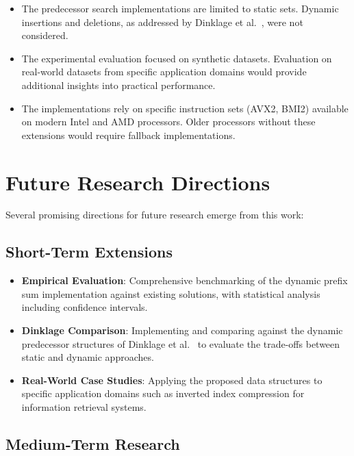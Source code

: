 \begin{itemize}
    \item The predecessor search implementations are limited to static sets. Dynamic insertions and deletions, as addressed by Dinklage et al.~\cite{Patrick_2021}, were not considered.

    \item The experimental evaluation focused on synthetic datasets. Evaluation on real-world datasets from specific application domains would provide additional insights into practical performance.

    \item The implementations rely on specific instruction sets (AVX2, BMI2) available on modern Intel and AMD processors. Older processors without these extensions would require fallback implementations.

\end{itemize}

\section{Future Research Directions}

Several promising directions for future research emerge from this work:

\subsection{Short-Term Extensions}

\begin{itemize}
    \item \textbf{Empirical Evaluation}: Comprehensive benchmarking of the dynamic prefix sum implementation against existing solutions, with statistical analysis including confidence intervals.

    \item \textbf{Dinklage Comparison}: Implementing and comparing against the dynamic predecessor structures of Dinklage et al.~\cite{Patrick_2021} to evaluate the trade-offs between static and dynamic approaches.

    \item \textbf{Real-World Case Studies}: Applying the proposed data structures to specific application domains such as inverted index compression for information retrieval systems.
\end{itemize}

\subsection{Medium-Term Research}

